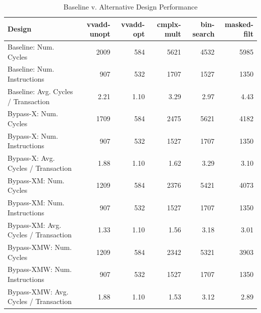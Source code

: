 \documentclass[10pt]{article}
\begin{document}

\begin{center}
\begin{table}[h]
\begin{tabular} {|l | r | r | r | r | r |}

\hline
\textbf{Design}    & \textbf{vvadd-unopt} & \textbf{vvadd-opt} & \textbf{cmplx-mult} & \textbf{bin-search} & \textbf{masked-filt} \\
\hline
Baseline:    Num. Cycles                 &    2009    &   584    &   5621   &  4532	&	5985					\\
Baseline: 	 Num. Instructions           &      907      &   532    &   1707   & 1527 &	1350					\\
Baseline:    Avg. Cycles / Transaction    &    2.21    &  1.10     &  3.29    & 2.97	&	4.43					\\

Bypass-X: Num. Cycles                 &    1709    &   584    &  2475    & 5621	&		4182				\\
Bypass-X: Num. Instructions           &      907      &    532   &   1527   & 1707 &		1350				\\
Bypass-X: Avg. Cycles / Transaction    &     1.88   &    1.10   &   1.62   & 3.29	&	3.10				    \\

Bypass-XM: Num. Cycles                 &    1209    &   584    &  2376    & 5421	&		4073				\\
Bypass-XM: Num. Instructions           &      907      &    532   &   1527   & 1707 &		1350				\\
Bypass-XM: Avg. Cycles / Transaction    &     1.33   &    1.10   &   1.56   & 3.18	&	3.01				    \\

Bypass-XMW: Num. Cycles                 &    1209    &   584    &  2342    & 5321	&		3903				\\
Bypass-XMW: Num. Instructions           &      907      &    532   &   1527   & 1707 &		1350				\\
Bypass-XMW: Avg. Cycles / Transaction    &     1.88   &    1.10   &   1.53   & 3.12	&	2.89				    \\
\hline                    
\end{tabular}
\caption{Baseline v. Alternative Design Performance}
\label{tab:cycles}
\end{table}
\end{center}

\pagebreak[4]
\end{document}
